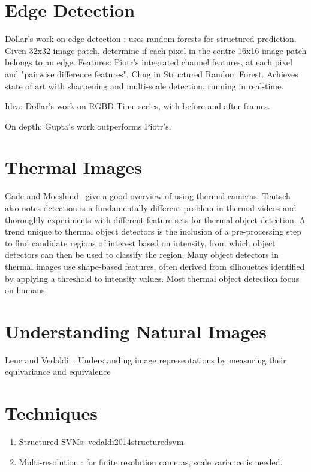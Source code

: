 \section{Edge Detection}
Dollar's work on edge detection \cite{dollar2014fast}: uses random forests for structured prediction. Given 32x32 image patch, determine if each pixel in the centre 16x16 image patch belongs to an edge. Features: Piotr's integrated channel features, at each pixel and "pairwise difference features". Chug in Structured Random Forest. Achieves state of art with sharpening and multi-scale detection, running in real-time.

Idea: Dollar's work on RGBD Time series, with before and after frames.

On depth: Gupta's work outperforms Piotr's.




\section{Thermal Images}
Gade and Moeslund~\cite{gade2014thermal} give a good
overview of using thermal cameras. 
Teutsch \etal~\cite{teutsch2014low} also notes detection is a fundamentally different problem in thermal videos and thoroughly experiments with different feature sets for thermal object detection. 
A trend unique to thermal object detectors is the inclusion of a pre-processing step to find candidate regions of interest based on intensity, from which object detectors can then be used to classify the region.
Many object detectors in thermal images use shape-based features, often derived
from silhouettes identified by applying a threshold to intensity values.
Most thermal object detection focus on humans.

\section{Understanding Natural Images}
Lenc and Vedaldi~\cite{lenc2014understanding}: Understanding image representations by measuring their equivariance and equivalence

\section{Techniques}
\begin{enumerate}
\item Structured SVMs: vedaldi2014structuredsvm
\item Multi-resolution \cite{park2010multiresolution}: for finite resolution cameras, scale variance is needed.
\end{enumerate}

